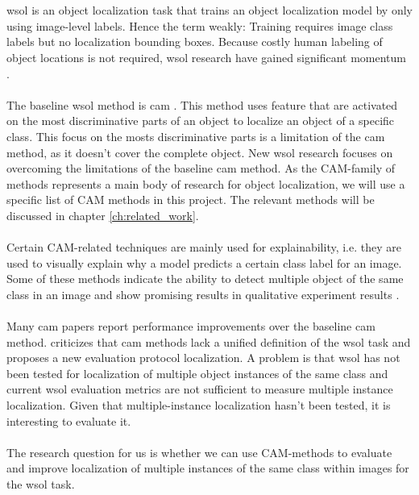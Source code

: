 \\\\
\acrshort{wsol} is an object localization task that trains an object localization model by only using image-level labels. Hence the term weakly: Training requires image class labels but no localization bounding boxes. Because costly human labeling of object locations is not required, \acrshort{wsol} research have gained significant momentum \cite{zhou2016cvpr, selvaraju2017grad, chattopadhay2018grad, wang2021minmaxcam, wang2020score, choe2020evaluating}.
\\\\
The baseline \acrshort{wsol} method is \acrfull{cam} \cite{zhou2016cvpr}. This method uses feature that are activated on the most discriminative parts of an object to localize an object of a specific class. This focus on the mosts discriminative parts is a limitation of the \acrshort{cam} method, as it doesn't cover the complete object. New \acrshort{wsol} research \cite{selvaraju2017grad, chattopadhay2018grad, wang2021minmaxcam, wang2020score, choe2020evaluating} focuses on overcoming the limitations of the baseline \acrshort{cam} method. As the CAM-family of methods represents a main body of research for object localization, we will use a specific list of CAM methods in this project. The relevant methods will be discussed in chapter \ref{ch:related_work}. 
\\\\
Certain CAM-related techniques are mainly used for explainability, i.e. they are used to visually explain why a model predicts a certain class label for an image. Some of these methods indicate the ability to detect multiple object of the same class in an image and show promising results in qualitative experiment results \cite{wang2020score}.
\\\\
Many \acrshort{cam} papers report performance improvements over the baseline \acrshort{cam} method. \cite{choe2020evaluating} criticizes that \acrshort{cam} methods lack a unified definition of the \acrshort{wsol} task and proposes a new evaluation protocol localization. A problem is that \acrshort{wsol} has not been tested for localization of multiple object instances of the same class and current \acrshort{wsol} evaluation metrics are not sufficient to measure multiple instance localization. Given that multiple-instance localization hasn't been tested, it is interesting to evaluate it. 
\\\\
The research question for us is whether we can use CAM-methods to evaluate and improve localization of multiple instances of the same class within images for the \acrshort{wsol} task.
